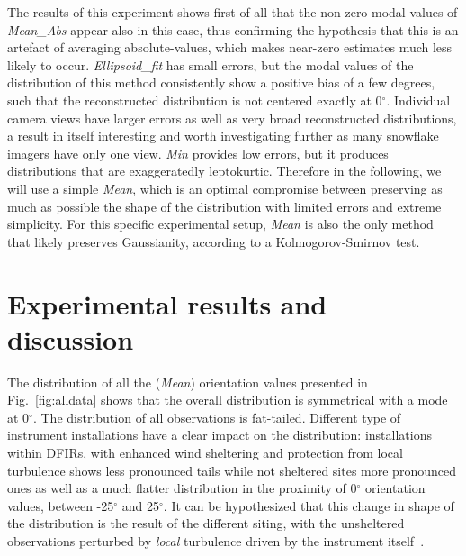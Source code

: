 \documentclass[draft]{agujournal2019}
\begin{document}
The results of this experiment shows first of all that the non-zero modal values of \textit{Mean\_Abs} appear also in this case, thus confirming the hypothesis that this is an artefact of averaging absolute-values, which makes near-zero estimates much less likely to occur. \textit{Ellipsoid\_fit} has small errors, but the modal values of the distribution of this method consistently show a positive bias of a few degrees, such that the reconstructed distribution is not centered exactly at 0$^\circ$. Individual camera views have larger errors as well as very broad reconstructed distributions, a result in itself interesting and worth investigating further as many snowflake imagers have only one view. \textit{Min} provides low errors, but it produces distributions that are exaggeratedly leptokurtic. Therefore in the following, we will use a simple \textit{Mean}, which is an optimal compromise between preserving as much as possible the shape of the distribution with limited errors and extreme simplicity. For this specific experimental setup, \textit{Mean} is also the only method that likely preserves Gaussianity, according to a Kolmogorov-Smirnov test.  

\section{Experimental results and discussion}
The distribution of all the (\textit{Mean}) orientation values presented in Fig.~\ref{fig:alldata} shows that the overall distribution is symmetrical with a mode at 0$^\circ$. The distribution of all observations is fat-tailed. Different type of instrument installations have a clear impact on the distribution: installations within DFIRs, with enhanced wind sheltering and protection from local turbulence shows less pronounced tails while not sheltered sites more pronounced ones as well as a much flatter distribution in the proximity of 0$^\circ$ orientation values, between -25$^\circ$ and 25$^\circ$. It can be hypothesized that this change in shape of the distribution is the result of the different siting, with the unsheltered observations perturbed by \textit{local} turbulence driven by the instrument itself~\cite<as described by>{Fitch_AMT_2021}. 
\end{document}
